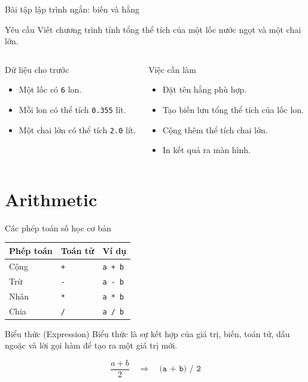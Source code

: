 \documentclass[aspectratio=169,10pt]{beamer}
\begin{document}
\begin{frame}[fragile]{Bài tập lập trình ngắn: biến và hằng}
\small
\begin{block}{Yêu cầu}
Viết chương trình tính tổng thể tích của một lốc nước ngọt và một chai lớn.
\end{block}
\begin{columns}[T,onlytextwidth]
\begin{block}{Dữ liệu cho trước}
\begin{itemize}
  \item Một lốc có \texttt{6} lon.
  \item Mỗi lon có thể tích \texttt{0.355} lít.
  \item Một chai lớn có thể tích \texttt{2.0} lít.
\end{itemize}
\end{block}
\begin{block}{Việc cần làm}
\begin{itemize}
  \item Đặt tên hằng phù hợp.
  \item Tạo biến lưu tổng thể tích của lốc lon.
  \item Cộng thêm thể tích chai lớn.
  \item In kết quả ra màn hình.
\end{itemize}
\end{block}
\end{columns}
\end{frame}

\section{Arithmetic}

\begin{frame}{Các phép toán số học cơ bản}
\begin{table}
\centering
\begin{tabular}{lll}
\toprule
Phép toán & Toán tử & Ví dụ \\
\midrule
Cộng & \texttt{+} & \texttt{a + b} \\
Trừ & \texttt{-} & \texttt{a - b} \\
Nhân & \texttt{*} & \texttt{a * b} \\
Chia & \texttt{/} & \texttt{a / b} \\
\bottomrule
\end{tabular}
\end{table}
\begin{block}{Biểu thức (Expression)}
Biểu thức là sự kết hợp của giá trị, biến, toán tử, dấu ngoặc và lời gọi hàm để tạo ra một giá trị mới.
\end{block}
\[
\frac{a+b}{2} \quad \Longrightarrow \quad \texttt{(a + b) / 2}
\]
\end{frame}
\end{document}
